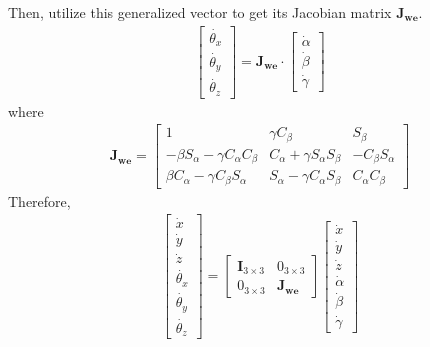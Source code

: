 Then, utilize this generalized vector to get its Jacobian matrix $\mathbf{J_{we}}$.
\begin{equation}
\begin{split}
\begin{bmatrix}
\dot{\theta _x} \\ 
\dot{\theta _y} \\ 
\dot{\theta _z}
\end{bmatrix}
=
\mathbf{J_{\!we}}
\cdot
\begin{bmatrix}
\dot{\alpha} \\ 
\dot{\beta} \\ 
\dot{\gamma}
\end{bmatrix}
\end{split}
\end{equation}
where
\begin{equation*}
\label{eq:jacobian_euler}
\begin{split}
\mathbf{J_{we}}
=
\begin{bmatrix}
1														& \gamma C_{\beta}							& S_{\beta}\\
- \beta S_{\alpha} -  \gamma C_{\alpha}C_{\beta}		& C_{\alpha} +  \gamma S_{\alpha}S_{\beta}	& -C_{\beta}S_{\alpha}\\
\beta C_{\alpha} -  \gamma C_{\beta}S_{\alpha}			& S_{\alpha} -  \gamma C_{\alpha}S_{\beta}	&  C_{\alpha}C_{\beta}
\end{bmatrix}
\end{split}
\end{equation*}
Therefore,
\begin{equation}
\begin{split}
\begin{bmatrix}
\dot{x} \\
\dot{y} \\
\dot{z} \\
\dot{\theta _x} \\
\dot{\theta _y} \\
\dot{\theta _z} 
\end{bmatrix}
=
\begin{bmatrix}
\mathbf{I}_{3\times 3} & 0_{3\times 3}\\
0_{3\times 3} & \mathbf{J_{we}}
\end{bmatrix}
\begin{bmatrix}
\dot{x} \\
\dot{y} \\
\dot{z} \\
\dot{\alpha} \\ 
\dot{\beta} \\ 
\dot{\gamma} 
\end{bmatrix}
\end{split}
\end{equation}
